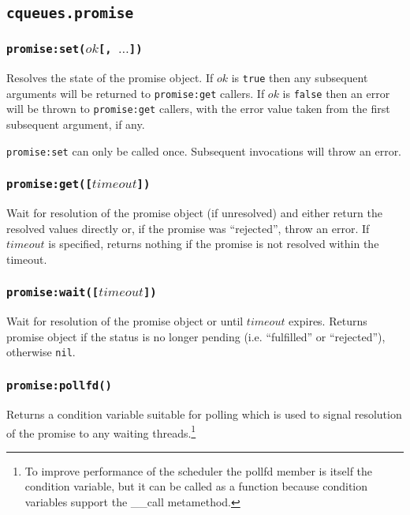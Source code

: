 \documentclass[11pt, oneside]{memoir}
\newcommand*{\fn}[1]{\texttt{#1}\xspace}
\newcommand*{\true}[0]{\texttt{true}\xspace}
\newcommand*{\false}[0]{\texttt{false}\xspace}
\newcommand*{\nil}[0]{\texttt{nil}\xspace}
\newcounter{toccols}
\newenvironment{Module}[1]{
	\subsection{\texttt{#1}}
	\addtocontents{toc}{
		\protect\begin{multicols}{\value{toccols}}
	}
}{
	\addtocontents{toc}{\protect\end{multicols}}
}
\begin{document}
\begin{Module}{cqueues.promise}
\subsubsection[\fn{promise:set}]{\fn{promise:set($ok$[, $\ldots$])}}

Resolves the state of the promise object. If $ok$ is \true then any subsequent arguments will be returned to \fn{promise:get} callers. If $ok$ is \false then an error will be thrown to \fn{promise:get} callers, with the error value taken from the first subsequent argument, if any.

\fn{promise:set} can only be called once. Subsequent invocations will throw an error.

\subsubsection[\fn{promise:get}]{\fn{promise:get([$timeout$])}}

Wait for resolution of the promise object (if unresolved) and either return the resolved values directly or, if the promise was ``rejected'', throw an error. If $timeout$ is specified, returns nothing if the promise is not resolved within the timeout.

\subsubsection[\fn{promise:wait}]{\fn{promise:wait([$timeout$])}}

Wait for resolution of the promise object or until $timeout$ expires. Returns promise object if the status is no longer pending (i.e. ``fulfilled'' or ``rejected''), otherwise \nil.

\subsubsection[\fn{promise:pollfd}]{\fn{promise:pollfd()}}

Returns a condition variable suitable for polling which is used to signal resolution of the promise to any waiting threads.\footnote{To improve performance of the scheduler the pollfd member is itself the condition variable, but it can be called as a function because condition variables support the \_\_call metamethod.}

\end{Module}
\end{document}
